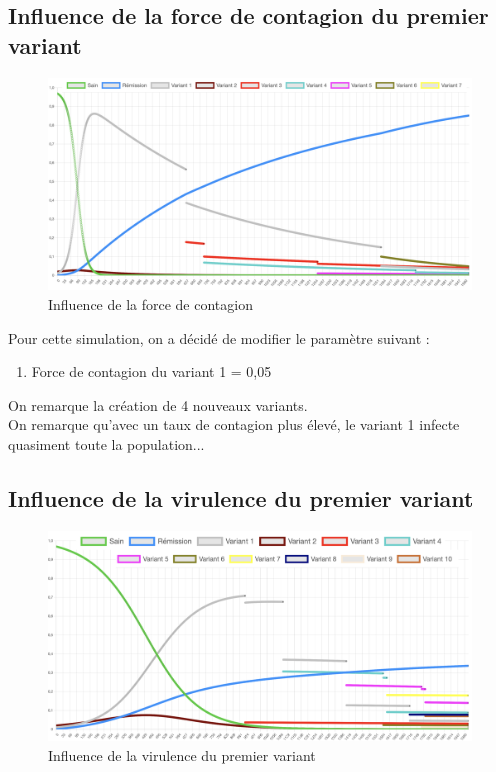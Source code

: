 \documentclass{article}
\begin{document}
\subsection{Influence de la force de contagion du premier variant}

\begin{figure}[h]
    \includegraphics[width=\linewidth]{images/Simulation3.png}
    \caption{Influence de la force de contagion}
    \label{fig:simulation3}
\end{figure}

Pour cette simulation, on a décidé de modifier le paramètre suivant :
\begin{enumerate}
    \item Force de contagion du variant 1 = 0,05 \\
\end{enumerate}
\noindent
On remarque la création de 4 nouveaux variants. \\

On remarque qu'avec un taux de contagion plus élevé, le variant 1 infecte quasiment toute la population... \\

\subsection{Influence de la virulence du premier variant}


\begin{figure}[h]
    \includegraphics[width=\linewidth]{images/Simulation4.png}
    \caption{Influence de la virulence du premier variant}
    \label{fig:simulation4}
\end{figure}
\end{document}
